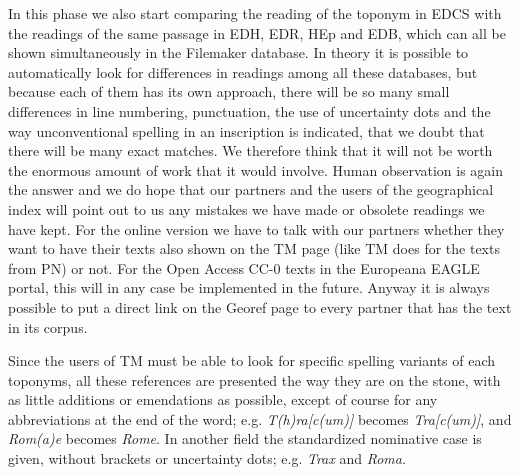 \documentclass[amsthm,ebook]{saparticle}
\begin{document}
In this phase we also start comparing the reading of the toponym in EDCS with the readings of the same passage in
EDH, EDR, HEp and EDB, which can all be shown simultaneously in the Filemaker database. In theory it is possible to
automatically look for differences in readings among all these databases, but because each of them has its own
approach, there will be so many small differences in line numbering, punctuation, the use of uncertainty dots and the
way unconventional spelling in an inscription is indicated, that we doubt that there will be many exact matches. We
therefore think that it will not be worth the enormous amount of work that it would involve. Human observation is again
the answer and we do hope that our partners and the users of the geographical index will point out to us any mistakes
we have made or obsolete readings we have kept. For the online version we have to talk with our partners whether they
want to have their texts also shown on the TM page (like TM does for the texts from PN) or not. For the Open Access
CC-0 texts in the Europeana EAGLE portal, this will in any case be implemented in the future. Anyway it is always
possible to put a direct link on the Georef page to every partner that has the text in its corpus.


Since the users of TM must be able to look for specific spelling variants of each toponyms, all these references are
presented the way they are on the stone, with as little additions or emendations as possible, except of course for any
abbreviations at the end of the word; e.g. \emph{T(h)ra[c(um)]} becomes \emph{Tra[c(um)]}, and \emph{Rom(a)e }becomes \emph{Rome}. In another field the standardized nominative case is given, without brackets or uncertainty dots; e.g. \emph{Trax} and \emph{Roma}.
\end{document}
